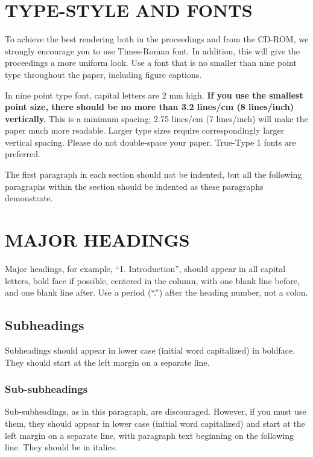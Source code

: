 \documentclass{article}
\begin{document}
\begin{sloppy}
\section{TYPE-STYLE AND FONTS}
\label{sec:typestyle}

To achieve the best rendering both in the proceedings and 
from the CD-ROM, we strongly encourage you to use Times-Roman 
font. In addition, this will give the proceedings a more uniform 
look. Use a font that is no smaller than nine point type 
throughout the paper, including figure captions.

In nine point type font, capital letters are 2 mm high.  
{\bf If you use the smallest point size, there should be 
no more than 3.2 lines/cm (8 lines/inch) vertically.}  
This is a minimum spacing; 2.75 lines/cm (7 lines/inch) 
will make the paper much more readable. Larger type sizes 
require correspondingly larger vertical spacing. Please do 
not double-space your paper. True-Type 1 fonts are preferred.

The first paragraph in each section should not be indented, 
but all the following paragraphs within the section should 
be indented as these paragraphs demonstrate.

\section{MAJOR HEADINGS}
\label{sec:majhead}

Major headings, for example, ``1. Introduction'', should 
appear in all capital letters, bold face if possible, 
centered in the column, with one blank line before, 
and one blank line after. Use a period (``.'') after 
the heading number, not a colon.

\subsection{Subheadings}
\label{ssec:subhead}

Subheadings should appear in lower case (initial word 
capitalized) in boldface. They should start at the left 
margin on a separate line. 
 
\subsubsection{Sub-subheadings}
\label{sssec:subsubhead}

Sub-subheadings, as in this paragraph, are discouraged. 
However, if you must use them, they should appear in 
lower case (initial word capitalized) and start at the 
left margin on a separate line, with paragraph
text beginning on the following line. They should be 
in italics. 
 


\end{sloppy}
\end{document}
